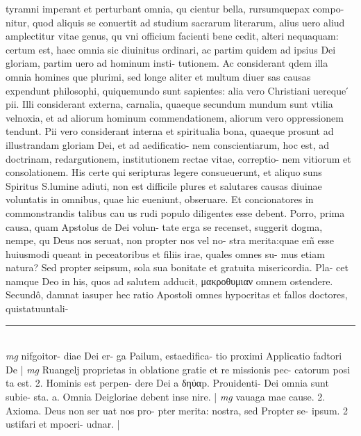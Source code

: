 \documentclass{article}
\begin{document}
\begin{pages}
tyramni imperant et perturbant omnia, qu cientur bella, rursumquepax compo- nitur, quod aliquis se conuertit ad studium sacrarum literarum, alius uero aliud amplectitur vitae genus, qu vni officium facienti bene cedit, alteri nequaquam: certum est, haec omnia sic diuinitus ordinari, ac partim quidem ad ipsius Dei gloriam, partim uero ad hominum insti- tutionem. Ac considerant qdem illa omnia homines que  plurimi, sed longe aliter et multum diuer sas causas expendunt philosophi, quiquemundo sunt sapientes: alia vero Christiani uereque ́ pii. Illi considerant externa, carnalia, quaeque  secundum mundum sunt vtilia velnoxia, et ad aliorum hominum commendationem, aliorum vero oppressionem tendunt. Pii vero considerant interna et spiritualia bona, quaeque  prosunt ad illustrandam gloriam Dei, et ad aedificatio- nem conscientiarum, hoc est, ad doctrinam, redargutionem, institutionem rectae vitae, correptio- nem vitiorum et consolationem. His certe qui seripturas legere consueuerunt, et aliquo suns Spiritus S.lumine adiuti, non est difficile plures et salutares causas diuinae voluntatis in omnibus, quae hic eueniunt, obseruare. Et concionatores in commonstrandis talibus cau us rudi populo diligentes esse debent. Porro, prima causa, quam Apstolus de Dei volun- tate erga se recenset, suggerit dogma, nempe, qu Deus nos seruat, non propter nos vel no- stra merita:quae em̃ esse huiusmodi queant in peceatoribus et filiis irae, quales omnes su- mus etiam natura? Sed propter seipsum, sola sua bonitate et gratuita misericordia. Pla- cet namque  Deo in his, quos ad salutem adducit, μακροθυμιαν omnem ostendere. Secundô, damnat iasuper hec ratio Apostoli omnes hypocritas et fallos doctores, quistatuuntali-  \pend
\vspace{0.5cm}\noindent
\vspace{0.2cm}\rule{1cm}{0.2pt}\\ 
\hspace{0.2cm}\textit{mg}
\footnotesize nifgoitor- diae Dei er- ga Pailum, estaedifica- tio proximi Applicatio fadtori De 
\normalsize| 
\hspace{0.2cm}\textit{mg}
\footnotesize Ruangelj proprietas in oblatione gratie et re missionis pec- catorum posi ta est. 2. Hominis est perpen- dere Dei a δηύαp. Prouidenti- Dei omnia sunt subie- sta. a. Omnia Deigloriae debent inse nire. 
\normalsize| 
\hspace{0.2cm}\textit{mg}
\footnotesize vauaga mae cause. 2. Axioma. Deus non ser uat nos pro- pter merita: nostra, sed Propter se- ipsum. 2 ustifari et mpocri- udnar. 
\normalsize| 

\end{pages}
\end{document}
